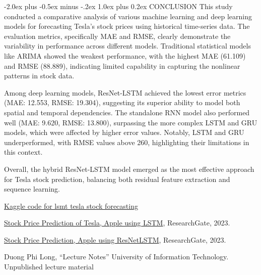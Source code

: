 \documentclass[twocolumn]{llncs}
\makeatletter
\renewcommand{\section}{\@startsection{section}{1}{\z@}%
  {-2.0ex plus -0.5ex minus -.2ex}%
  {1.0ex plus 0.2ex}%
  {\centering\normalfont\normalsize\bfseries}}
\makeatother
\begin{document}
\section{CONCLUSION}
This study conducted a comparative analysis of various machine learning and deep learning models for forecasting Tesla's stock prices using historical time-series data. The evaluation metrics, specifically MAE and RMSE, clearly demonstrate the variability in performance across different models. Traditional statistical models like ARIMA showed the weakest performance, with the highest MAE (61.109) and RMSE (88.889), indicating limited capability in capturing the nonlinear patterns in stock data. 

\noindent Among deep learning models, ResNet-LSTM achieved the lowest error metrics (MAE: 12.553, RMSE: 19.304), suggesting its superior ability to model both spatial and temporal dependencies. The standalone RNN model also performed well (MAE: 9.620, RMSE: 13.800), surpassing the more complex LSTM and GRU models, which were affected by higher error values. Notably, LSTM and GRU underperformed, with RMSE values above 260, highlighting their limitations in this context.

Overall, the hybrid ResNet-LSTM model emerged as the most effective approach for Tesla stock prediction, balancing both residual feature extraction and sequence learning. 






\begin{thebibliography}{8}
\href{https://www.kaggle.com/code/guslovesmath/tesla-stock-forecasting-multi-step-stacked-lstm}{Kaggle code for lsmt tesla stock forecasting}

\href{https://www.researchgate.net/publication/373013410_Stock_Price_Prediction_of_Tesla_Apple_using_LSTM}{Stock Price Prediction of Tesla, Apple using LSTM}, ResearchGate, 2023.


\href{https://github.com/JinleiZhangBJTU/ResNet-LSTM-GCN}{Stock Price Prediction, Apple using ResNetLSTM}, ResearchGate, 2023.

Duong Phi Long, ``Lecture Notes'' University of Information Technology. Unpublished lecture material


\end{thebibliography}
\end{document}
